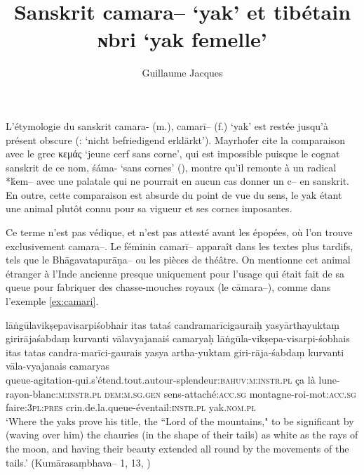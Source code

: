 \documentclass[oldfontcommands,oneside,a4paper,11pt]{article}
\newcommand{\ipa}[1]{{\phon #1}} %
\newcommand{\grec}[1]{{\mleccha #1}}
\begin{document}
 
\title{Sanskrit \ipa{camara--} `yak' et tibétain \ipa{ɴbri} `yak femelle'}
\author{Guillaume Jacques}
\maketitle
L'étymologie du sanskrit \ipa{camara-} (m.), \ipa{camarī--} (f.) `yak' est restée jusqu'à présent obscure (\citealt[I, 375]{mayrhofer56kurz}: `nicht befriedigend erklärkt'). Mayrhofer cite la comparaison avec le grec \grec{κεμάς} `jeune cerf sans corne', qui est impossible puisque le cognat sanskrit de ce nom, \ipa{śáma-} `sans cornes' (\citealt[II, 289]{mayrhofer56kurz}), montre qu'il remonte à un radical *\ipa{ḱem--} avec une palatale qui ne pourrait en aucun cas donner un \ipa{c--} en sanskrit. En outre, cette comparaison est absurde du point de vue du sens, le yak étant une animal plutôt connu pour sa vigueur et ses cornes imposantes.


Ce terme n'est pas védique, et n'est pas attesté avant les épopées, où l'on trouve exclusivement   \ipa{camara--}.  Le féminin \ipa{camarī--} apparaît dans les textes plus tardifs, tels que le \ipa{Bhāgavatapurāṇa--} ou les pièces de théâtre. On mentionne cet animal étranger à l'Inde ancienne presque uniquement pour l'usage qui était fait de sa queue pour fabriquer des chasse-mouches royaux (le  \ipa{cāmara--}), comme dans l'exemple \ref{ex:camari}.

\begin{exe}
\ex \label{ex:camari}
\glt lāṅgūlavikṣepavisarpiśobhair itas tataś candramarīcigauraiḥ 
\glt yasyārthayuktaṃ girirājaśabdaṃ kurvanti vālavyajanaiś camaryaḥ 
\gll lāṅgūla-vikṣepa-visarpi-śobhais itas tatas candra-marīci-gaurais yasya artha-yuktam giri-rāja-śabdaṃ kurvanti vāla-vyajanais camaryas \\
queue-agitation-qui.s'étend.tout.autour-splendeur:\textsc{bahuv:m:instr.pl} ça là lune-rayon-blanc:\textsc{m:instr.pl} \textsc{dem:m.sg.gen} sens-attaché:\textsc{acc.sg} montagne-roi-mot:\textsc{acc.sg} faire:\textsc{3pl:pres} crin.de.la.queue-éventail\textsc{:instr.pl} yak.\textsc{nom.pl} \\
\glt  `Where the yaks prove his title, the ``Lord of the mountains,"  to be significant by (waving over him) the chauries (in the shape of their tails) as white as the rays of the moon, and having their beauty extended all round by the movements of the tails.' (\ipa{Kumārasaṃbhava--} 1, 13, \citealt[204]{kale17kumarasambhava})
\end{exe}
\end{document}
